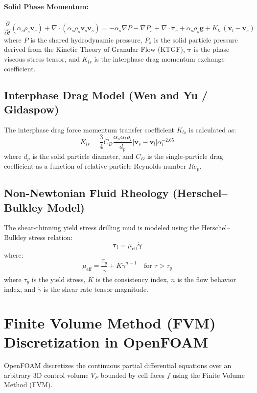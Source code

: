 \documentclass[12pt,a4paper]{article}
\begin{document}
\paragraph{Solid Phase Momentum:}
\begin{equation}
\frac{\partial}{\partial t}(\alpha_s \rho_s \mathbf{v}_s) + \nabla \cdot (\alpha_s \rho_s \mathbf{v}_s \mathbf{v}_s) = -\alpha_s \nabla P - \nabla P_s + \nabla \cdot \boldsymbol{\tau}_s + \alpha_s \rho_s \mathbf{g} + K_{ls}(\mathbf{v}_l - \mathbf{v}_s)
\end{equation}
where $P$ is the shared hydrodynamic pressure, $P_s$ is the solid particle pressure derived from the Kinetic Theory of Granular Flow (KTGF), $\boldsymbol{\tau}$ is the phase viscous stress tensor, and $K_{ls}$ is the interphase drag momentum exchange coefficient.

\subsection{Interphase Drag Model (Wen and Yu / Gidaspow)}
The interphase drag force momentum transfer coefficient $K_{ls}$ is calculated as:
\begin{equation}
K_{ls} = \frac{3}{4} C_D \frac{\alpha_s \alpha_l \rho_l}{d_p} |\mathbf{v}_s - \mathbf{v}_l| \alpha_l^{-2.65}
\end{equation}
where $d_p$ is the solid particle diameter, and $C_D$ is the single-particle drag coefficient as a function of relative particle Reynolds number $Re_p$.

\subsection{Non-Newtonian Fluid Rheology (Herschel--Bulkley Model)}
The shear-thinning yield stress drilling mud is modeled using the Herschel--Bulkley stress relation:
\begin{equation}
\boldsymbol{\tau}_l = \mu_{\text{eff}} \dot{\boldsymbol{\gamma}}
\end{equation}
where:
\begin{equation}
\mu_{\text{eff}} = \frac{\tau_y}{\dot{\gamma}} + K \dot{\gamma}^{n-1} \quad \text{for } \tau > \tau_y
\end{equation}
where $\tau_y$ is the yield stress, $K$ is the consistency index, $n$ is the flow behavior index, and $\dot{\gamma}$ is the shear rate tensor magnitude.
\section{Finite Volume Method (FVM) Discretization in OpenFOAM}
OpenFOAM discretizes the continuous partial differential equations over an arbitrary 3D control volume $V_P$ bounded by cell faces $f$ using the Finite Volume Method (FVM).
\end{document}
